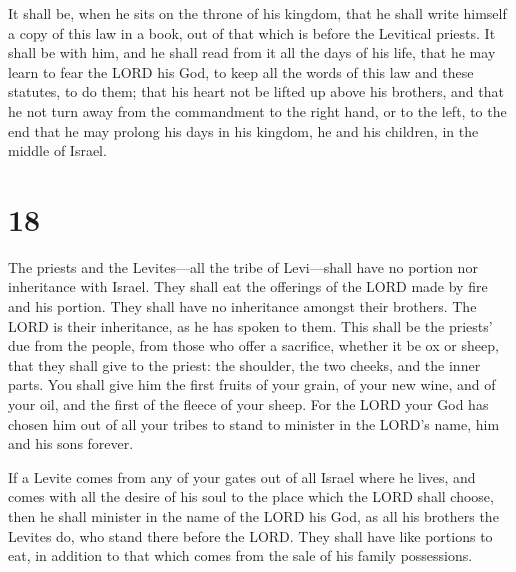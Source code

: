 It shall be, when he sits on the throne of his kingdom,
that he shall write himself a copy of this law in a book, out of that
which is before the Levitical priests.  It shall be with
him, and he shall read from it all the days of his life, that he may
learn to fear the LORD his God, to keep all the words of this law and
these statutes, to do them;  that his heart not be lifted
up above his brothers, and that he not turn away from the commandment to
the right hand, or to the left, to the end that he may prolong his days
in his kingdom, he and his children, in the middle of Israel.

\hypertarget{section-17}{%
\section{18}\label{section-17}}

 The priests and the Levites---all the tribe of
Levi---shall have no portion nor inheritance with Israel. They shall eat
the offerings of the LORD made by fire and his portion. 
They shall have no inheritance amongst their brothers. The LORD is their
inheritance, as he has spoken to them.  This shall be the
priests' due from the people, from those who offer a sacrifice, whether
it be ox or sheep, that they shall give to the priest: the shoulder, the
two cheeks, and the inner parts.  You shall give him the
first fruits of your grain, of your new wine, and of your oil, and the
first of the fleece of your sheep.  For the LORD your God
has chosen him out of all your tribes to stand to minister in the LORD's
name, him and his sons forever.

 If a Levite comes from any of your gates out of all
Israel where he lives, and comes with all the desire of his soul to the
place which the LORD shall choose,  then he shall minister
in the name of the LORD his God, as all his brothers the Levites do, who
stand there before the LORD.  They shall have like
portions to eat, in addition to that which comes from the sale of his
family possessions.

